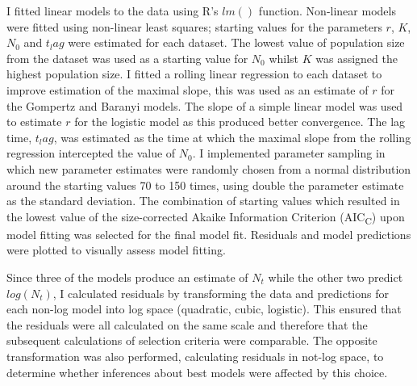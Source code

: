 \documentclass[11pt]{article}
\begin{document}
\begin{linenumbers}
            I fitted linear models to the data using R's $lm()$ function. Non-linear models were fitted using non-linear least squares; starting values for the parameters $r$, $K$, $N_0$ and $t_lag$ were estimated for each dataset. The lowest value of population size from the dataset was used as a starting value for $N_0$ whilst $K$ was assigned the highest population size. I fitted a rolling linear regression to each dataset to improve estimation of the maximal slope, this was used as an estimate of $r$ for the Gompertz and Baranyi models. The slope of a simple linear model was used to estimate $r$ for the logistic model as this produced better convergence. The lag time, $t_lag$, was estimated as the time at which the maximal slope from the rolling regression intercepted the value of $N_0$. I implemented parameter sampling in which new parameter estimates were randomly chosen from a normal distribution around the starting values 70 to 150 times, using double the parameter estimate as the standard deviation. The combination of starting values which resulted in the lowest value of the size-corrected Akaike Information Criterion (AIC\textsubscript{C}) upon model fitting was selected for the final model fit. Residuals and model predictions were plotted to visually assess model fitting. 
            
            
            Since three of the models produce an estimate of $N_t$ while the other two predict $log(N_t)$, I calculated residuals by transforming the data and predictions for each non-log model into log space (quadratic, cubic, logistic). This ensured that the residuals were all calculated on the same scale and therefore that the subsequent calculations of selection criteria were comparable. The opposite transformation was also performed, calculating residuals in not-log space, to determine whether inferences about best models were affected by this choice.
            

\end{linenumbers}
\end{document}
